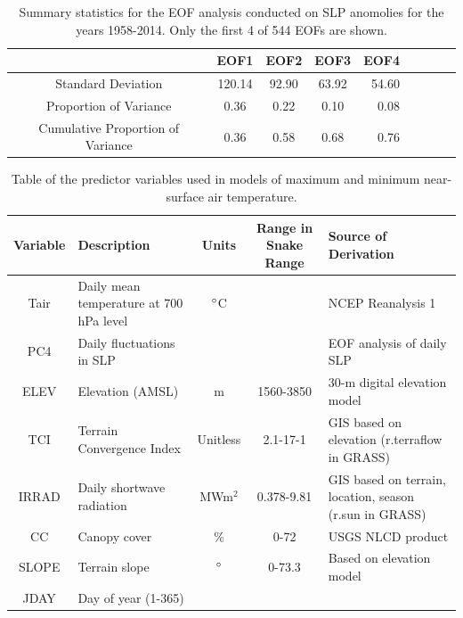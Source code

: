 \documentclass{ametsoc}
\begin{document}
\begin{table}[t]
\caption{Summary statistics for the EOF analysis conducted on SLP anomolies
          for  the years 1958-2014.  Only the first 4 of 544 EOFs are shown.}\label{tab:1}
\begin{center}
\begin{tabular}{ccccrrcrc}
\hline\hline
\ & EOF1 & EOF2 & EOF3 & EOF4 \\
\hline
Standard Deviation & 120.14 & 92.90 & 63.92 & 54.60\\
Proportion of Variance & 0.36 & 0.22 & 0.10 & 0.08 \\
Cumulative Proportion of Variance & 0.36 & 0.58 & 0.68 & 0.76 \\
\hline
\end{tabular}
\end{center}
\end{table}

\begin{table}[t]
\caption{Table of the predictor variables used in models of maximum 
		and minimum near-surface air temperature.}\label{tab:2}
\begin{center}
\begin{tabular}{clccl}
\hline\hline
Variable & Description & Units & Range in Snake Range & Source of Derivation \\
\hline
Tair  & Daily mean temperature at 700 hPa level & $\degree$C & \          & NCEP Reanalysis 1 \\
PC4   & Daily fluctuations in SLP               & \          & \          & EOF analysis of daily SLP \\
ELEV  & Elevation (AMSL)                        & m          & 1560-3850  & 30-m digital elevation model \\
TCI   & Terrain Convergence Index               & Unitless   & 2.1-17-1   & GIS based on elevation (r.terraflow in GRASS) \\
IRRAD & Daily shortwave radiation               & MWm$^2$    & 0.378-9.81 & GIS based on terrain, location, season (r.sun in GRASS) \\
CC    & Canopy cover                            & \%         & 0-72       & USGS NLCD product \\
SLOPE & Terrain slope                           & $\degree$  & 0-73.3     & Based on elevation model \\
JDAY  & Day of year (1-365)                     & \          & \          & \  \\
\hline
\end{tabular}
\end{center}
\end{table}
\end{document}
